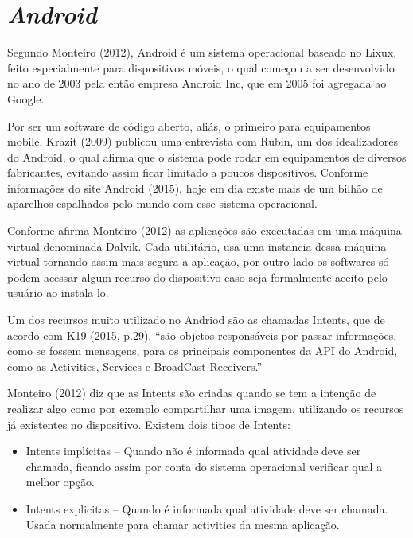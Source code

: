 \section{\textit{Android}}

	\par Segundo Monteiro (2012), Android é um sistema operacional baseado no
Lixux, feito especialmente para dispositivos móveis, o qual começou a ser
desenvolvido no ano de 2003 pela então empresa Android Inc, que em 2005 foi
agregada ao Google.

	\par Por ser um software de código aberto, aliás, o primeiro para equipamentos
mobile, Krazit (2009) publicou uma entrevista com Rubin, um dos idealizadores
do Android, o qual afirma que o sistema pode rodar em equipamentos de diversos
fabricantes, evitando assim ficar limitado a poucos dispositivos. Conforme
informações do site Android (2015), hoje em dia existe mais de um bilhão de
aparelhos espalhados pelo mundo com esse sistema operacional.
	
	\par Conforme afirma Monteiro (2012) as aplicações são executadas em uma
máquina virtual denominada Dalvik. Cada utilitário, usa uma instancia dessa
máquina virtual tornando assim mais segura a aplicação, por outro lado os
softwares só podem acessar algum recurso do dispositivo caso seja formalmente
aceito pelo usuário ao instala-lo.

	\par Um dos recursos muito utilizado no Andriod são as chamadas Intents, que de
acordo com K19 (2015, p.29), “são objetos responsáveis por passar informações,
como se fossem mensagens, para os principais componentes da API do Android,
como as Activities, Services e BroadCast Receivers.” \par Monteiro (2012) diz
que as Intents são criadas quando se tem a intenção de realizar algo como por
exemplo compartilhar uma imagem, utilizando os recursos já existentes no
dispositivo. Existem dois tipos de Intents:

	\begin{itemize}
  		\item Intents implícitas – Quando não é informada qual atividade deve ser
 			chamada, ficando assim por conta do sistema operacional verificar qual a
 			melhor opção.
  		\item Intents explicitas – Quando é informada qual atividade deve ser
  			chamada. Usada normalmente para chamar activities da mesma aplicação.
	\end{itemize}
	
